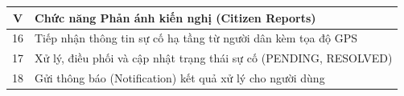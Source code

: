 \begin{longtable}{|c|p{}|}
\textbf{V} & \textbf{Chức năng Phản ánh kiến nghị (Citizen Reports)} \\ \hline
16 & Tiếp nhận thông tin sự cố hạ tầng từ người dân kèm tọa độ GPS \\ \hline
17 & Xử lý, điều phối và cập nhật trạng thái sự cố (PENDING, RESOLVED) \\ \hline
18 & Gửi thông báo (Notification) kết quả xử lý cho người dùng \\ 
\end{longtable}
